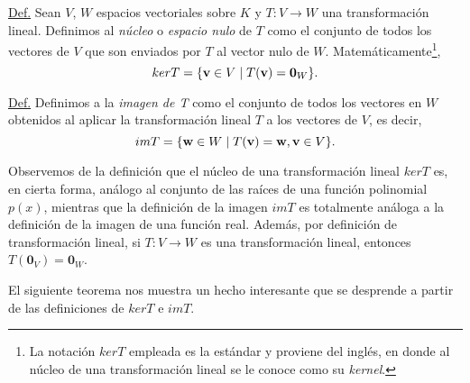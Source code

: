\documentclass[12pt]{article}
\begin{document}
\begin{tcolorbox} \label{Def:Nucleo_e_imagen_de_una_transformación_lineal} 
 
    \underline{Def.} Sean $V$, $W$ espacios vectoriales sobre $K$ y $T:V\to W$ una transformación lineal. Definimos al \emph{núcleo} o \emph{espacio nulo} de $T$ como el conjunto de todos los vectores de $V$ que son enviados por $T$ al vector nulo de $W$. Matemáticamente\footnote{La notación $kerT$ empleada es la estándar y proviene del inglés, en donde al núcleo de una transformación lineal se le conoce como su \emph{kernel}.}, $$kerT=\{ \mathbf{v}\in V\hspace{1mm}|\hspace{1mm}T(\mathbf{v})=\mathbf{0}_W\}.$$ 

    \vspace{3mm} 

    \underline{Def.} Definimos a la \emph{imagen de T} como el conjunto de todos los vectores en $W$ obtenidos al aplicar la transformación lineal $T$ a los vectores de $V$, es decir, $$imT=\{\mathbf{w}\in W\hspace{1mm} |\hspace{1mm} T(\mathbf{v})=\mathbf{w}, \mathbf{v}\in V\}.$$

\end{tcolorbox}

Observemos de la definición que el núcleo de una transformación lineal $kerT$ es, en cierta forma, análogo al conjunto de las raíces de una función polinomial $p(x)$, mientras que la definición de la imagen $imT$ es totalmente análoga a la definición de la imagen de una función real. Además, por definición de transformación lineal, si $T:V\to W$ es una transformación lineal, entonces $T(\mathbf{0}_V)=\mathbf{0}_W$.

El siguiente teorema nos muestra un hecho interesante que se desprende a partir de las definiciones de $kerT$ e $imT$.
\end{document}
